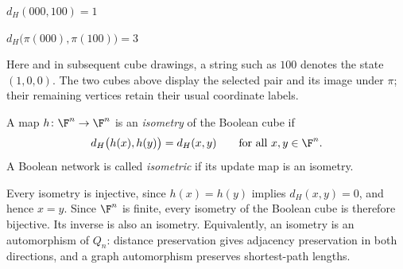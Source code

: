 \begin{example}
\begin{center}
\begin{minipage}{0.46\linewidth}
            \small $d_H(000,100)=1$
        \end{minipage}
        \hfill
        \begin{minipage}{0.46\linewidth}
            \centering

            \small $d_H\bigl(\pi(000),\pi(100)\bigr)=3$
        \end{minipage}
    \end{center}
    Here and in subsequent cube drawings, a string such as $100$ denotes the state $(1,0,0)$. The two cubes above display the selected pair and its image under $\pi$; their remaining vertices retain their usual coordinate labels.
\end{example}

\begin{definition}\label{def:cube-isometry}
    A map $h\colon\F^n\to\F^n$ is an \emph{isometry} of the Boolean cube if
    \[
        d_H\bigl(h(x),h(y)\bigr)=d_H(x,y)
        \qquad\text{for all }x,y\in\F^n.
    \]
    A Boolean network is called \emph{isometric} if its update map is an isometry.
\end{definition}

Every isometry is injective, since $h(x)=h(y)$ implies $d_H(x,y)=0$, and hence $x=y$. Since $\F^n$ is finite, every isometry of the Boolean cube is therefore bijective. Its inverse is also an isometry. Equivalently, an isometry is an automorphism of $Q_n$: distance preservation gives adjacency preservation in both directions, and a graph automorphism preserves shortest-path lengths.

